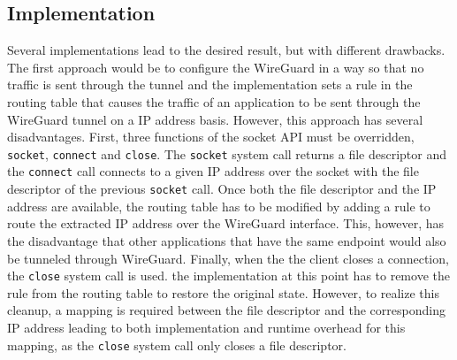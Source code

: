 \subsection{Implementation}
Several implementations lead to the desired result, but with different drawbacks.
The first approach would be to configure the WireGuard in a way so that no traffic is sent through the tunnel and the \ld implementation sets a rule in the routing table that causes the traffic of an application to be sent through the WireGuard tunnel on a IP address basis.
However, this approach has several disadvantages.
First, three functions of the socket API must be overridden, \texttt{socket}, \texttt{connect} and \texttt{close}.
The \texttt{socket} system call returns a file descriptor and the \texttt{connect} call connects to a given IP address over the socket with the file descriptor of the previous \texttt{socket} call.
Once both the file descriptor and the IP address are available, the routing table has to be modified by adding a rule to route the extracted IP address over the WireGuard interface.
This, however, has the disadvantage that other applications that have the same endpoint would also be tunneled through WireGuard.
Finally, when the the client closes a connection, the \texttt{close} system call is used.
the \ld implementation at this point has to remove the rule from the routing table to restore the original state.
However, to realize this cleanup, a mapping is required between the file descriptor and the corresponding IP address leading to both implementation and runtime overhead for this mapping, as the \texttt{close} system call only closes a file descriptor.


